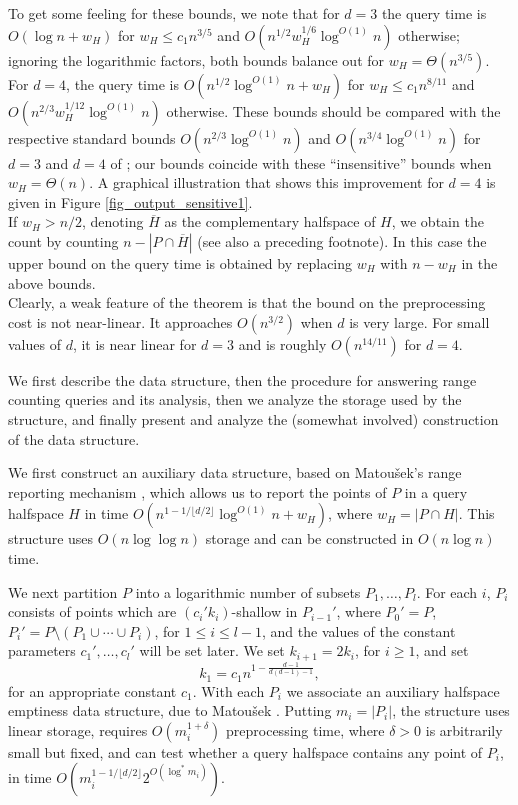 \documentclass[11pt]{article}
\def\ol#1{\overline{#1}}
\begin{document}
 To get some feeling for these bounds, we note that for $d = 3$ the query time is $O(\log n + w_{H})$ for $w_{H} \leq c_{1} n^{3/5}$ and $O(n^{1/2} w_{H}^{1/6} \log^{O(1)}n)$ otherwise; ignoring the logarithmic factors, both bounds balance out for $w_{H} = \Theta(n^{3/5})$. For $d = 4$, the query time is $O(n^{1/2}\log^{O(1)}n + w_{H})$ for $w_{H} \leq c_{1} n^{8/11}$ and $O(n^{2/3} w_{H}^{1/12} \log^{O(1)}n)$ otherwise. These bounds should be compared with the respective standard bounds $O(n^{2/3} \log^{O(1)}n)$ and $O(n^{3/4} \log^{O(1)}n)$ for $d = 3$ and $d = 4$ of \cite{mat92a}; our bounds coincide with these ``insensitive'' bounds when $w_{H} = \Theta(n)$. A graphical illustration that shows this improvement for $d = 4$ is given in Figure \ref{fig_output_sensitive1}. \\
 If $w_{H} > n/2$, denoting $\ol{H}$ as the complementary halfspace of $H$, we obtain the count by counting $n - |P \cap \ol{H}|$ (see also a preceding footnote). In this case the upper bound on the query time is obtained by replacing $w_{H}$ with $n - w_{H}$ in the above bounds. \\
 Clearly, a weak feature of the theorem is that the bound on the preprocessing cost is not near-linear. It approaches $O(n^{3/2})$ when $d$ is very large. For small values of $d$, it is near linear for $d = 3$ and is roughly $O(n^{14/11})$ for $d = 4$.

 We first describe the data structure, then the procedure for answering range counting queries and its analysis, then we analyze the storage used by the structure, and finally present and analyze the (somewhat involved) construction of the data structure.


 We first construct an auxiliary data structure, based on Matou\v{s}ek's range reporting mechanism \cite{mat92b}, which allows us to report the points of $P$ in a query halfspace $H$ in time $O(n^{1-1/ \lfloor d/2 \rfloor} \log^{O(1)}n + w_{H})$, where $w_{H} = |P \cap H|$. This structure uses $O(n \log \log n)$ storage and can be constructed in $O(n \log n)$ time.

We next partition $P$ into a logarithmic number of subsets $P_{1}, \ldots, P_{l}$. For each $i$, $P_{i}$ consists of points which are $(c_{i}' k_{i})$-shallow in $P_{i-1}'$, where $P_{0}' = P$, $P_{i}' = P \setminus (P_{1} \cup \cdots \cup P_{i})$, for $1 \leq i \leq l-1$, and the values of the constant parameters $c_{1}', \ldots, c_{l}'$ will be set later. We set $k_{i+1} = 2k_{i}$, for $i \geq 1$, and set
\begin{equation} \label{eq_range_counting_k1}
k_{1} = c_{1} n^{1 - \frac{d-1}{d(d-1)-1}},
\end{equation}
for an appropriate constant $c_{1}$. With each $P_{i}$ we associate an auxiliary halfspace emptiness data structure, due to Matou\v{s}ek \cite{mat92b}. Putting $m_{i} = |P_{i}|$, the structure uses linear storage, requires $O(m_{i}^{1+\delta})$ preprocessing time, where $\delta > 0$ is arbitrarily small but fixed, and can test whether a query halfspace contains any point of $P_{i}$, in time $O(m_{i}^{1-1/ \lfloor d/2 \rfloor} 2^{O(\log^{*}m_{i})})$.
\end{document}
